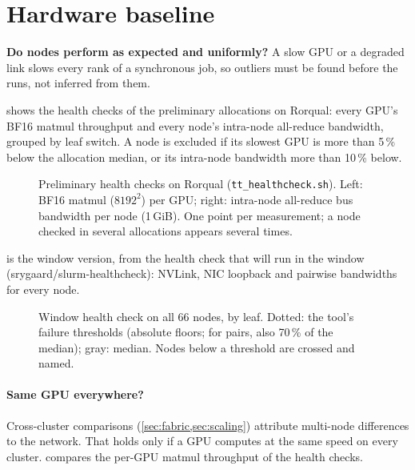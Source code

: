 \section{Hardware baseline}
\label{sec:hardware}

\begin{question}
  \textbf{Do nodes perform as expected and uniformly?} A slow GPU or a degraded link slows every rank of
  a synchronous job, so outliers must be found before the runs, not inferred from them.
\end{question}

 shows the health checks of the preliminary allocations on Rorqual: every GPU's BF16
matmul throughput and every node's intra-node all-reduce bandwidth, grouped by leaf switch. A node is
excluded if its slowest GPU is more than 5\,\% below the allocation median, or its intra-node bandwidth
more than 10\,\% below.

\begin{figure}[h]
  \centering{}
  \caption{Preliminary health checks on Rorqual (\texttt{tt\_healthcheck.sh}). Left: BF16 matmul
    ($8192^2$) per GPU; right: intra-node all-reduce bus bandwidth per node (1\,GiB). One point per
    measurement; a node checked in several allocations appears several times.}
  \label{fig:health-tt}
\end{figure}


 is the window version, from the health check that will run in the window
(srygaard/slurm-healthcheck): NVLink, NIC loopback and pairwise bandwidths for every node.

\begin{figure}[h]
  \centering{}
  \caption{Window health check on all 66 nodes, by leaf. Dotted: the
    tool's failure thresholds (absolute floors; for pairs, also 70\,\% of the median); gray: median.
    Nodes below a threshold are crossed and named.}
  \label{fig:health-window}
\end{figure}


\paragraph{Same GPU everywhere?} Cross-cluster comparisons (\cref{sec:fabric,sec:scaling}) attribute
multi-node differences to the network. That holds only if a GPU computes at the same speed on every
cluster.  compares the per-GPU matmul throughput of the health checks.

